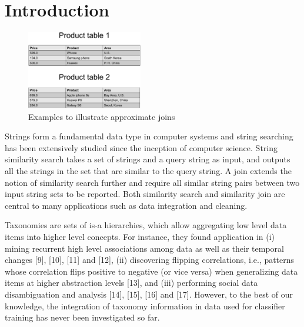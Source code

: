 \documentclass{sig-alternate}
\begin{document}




\section{Introduction}



\begin{figure}[t]
\centering
\includegraphics[width=0.45\textwidth]{figures/productexample}
 \caption{Examples to illustrate approximate joins}
\label{fig:autocompletion}
\end{figure}


Strings form a fundamental data type in computer systems and string searching has been extensively studied since the
inception of computer science. String similarity search takes a set of strings and a query string as input, and outputs all
the strings in the set that are similar to the query string. A join extends the notion of similarity search further and require
all similar string pairs between two input string sets to be reported. Both similarity search and similarity join are
central to many applications such as data integration and cleaning.

 Taxonomies are sets of is-a hierarchies, which allow aggregating low level data items into higher level concepts. For instance, they found application in (i) mining recurrent high level associations among data as well as their temporal changes [9], [10], [11] and [12], (ii) discovering flipping correlations, i.e., patterns whose correlation flips positive to negative (or vice versa) when generalizing data items at higher abstraction levels [13], and (iii) performing social data disambiguation and analysis [14], [15], [16] and [17]. However, to the best of our knowledge, the integration of taxonomy information in data used for classifier training has never been investigated so far.
\end{document}
